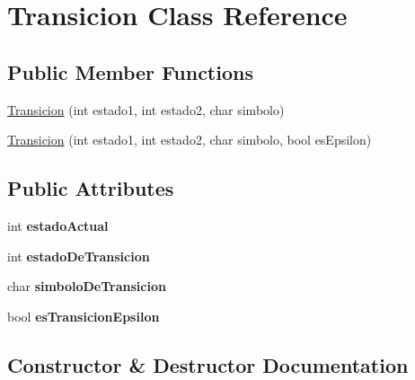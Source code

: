 \hypertarget{class_transicion}{}\section{Transicion Class Reference}
\label{class_transicion}
\subsection*{Public Member Functions}
\begin{DoxyCompactItemize}
\item 
\hyperlink{class_transicion_a1381b8057ba09d24f5ebf9518260fa17}{Transicion} (int estado1, int estado2, char simbolo)
\item 
\hyperlink{class_transicion_a40753eedf9868e28af9e19397386d46e}{Transicion} (int estado1, int estado2, char simbolo, bool es\+Epsilon)
\end{DoxyCompactItemize}
\subsection*{Public Attributes}
\begin{DoxyCompactItemize}
\item 
\mbox{\label{class_transicion_af692c99444906c0bc63499de451345b0}} 
int {\bfseries estado\+Actual}
\item 
\mbox{\label{class_transicion_aef24ba84d109a5e4a63b0206cdac0842}} 
int {\bfseries estado\+De\+Transicion}
\item 
\mbox{\label{class_transicion_aef70116223bcbe49801b698bfb0554b0}} 
char {\bfseries simbolo\+De\+Transicion}
\item 
\mbox{\label{class_transicion_a990f35e1812b21900c2985541f204324}} 
bool {\bfseries es\+Transicion\+Epsilon}
\end{DoxyCompactItemize}


\subsection{Constructor \& Destructor Documentation}
\mbox{\label{class_transicion_a1381b8057ba09d24f5ebf9518260fa17}} 
